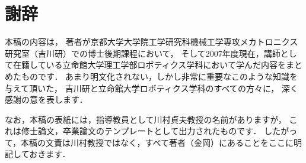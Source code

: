 \section*{謝辞}

本稿の内容は，
著者が京都大学大学院工学研究科機械工学専攻メカトロニクス研究室（吉川研）での博士後期課程において，
そして2007年度現在，講師として在籍している立命館大学理工学部ロボティクス学科において学んだ内容をまとめたものです．
あまり明文化されない，しかし非常に重要なこのような知識を与えて頂いた，
吉川研と立命館大学ロボティクス学科のすべての方々に，
深く感謝の意を表します．

なお，本稿の表紙には，指導教員として川村貞夫教授の名前がありますが，
これは修士論文，卒業論文のテンプレートとして出力されたものです．
したがって，本稿の文責は川村教授ではなく，すべて著者（金岡）にあることをここに明記しておきます．
